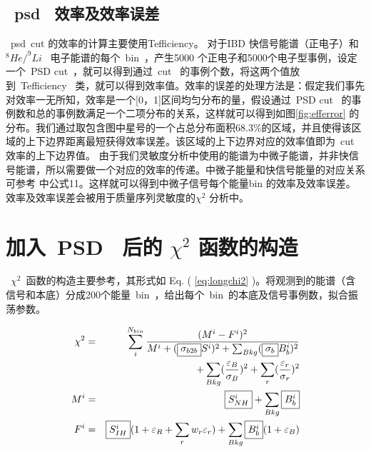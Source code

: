 \subsection{~psd~ 效率及效率误差}
~psd~cut 的效率的计算主要使用Tefficiency\citep{TEfficiency}。 对于IBD 快信号能谱（正电子）和~$^{8}He/^{9}Li$~ 电子能谱的每个~bin~，产生5000 个正电子和5000个电子型事例，设定一个~PSD cut~，就可以得到通过~cut~ 的事例个数，将这两个值放到~Tefficiency~ 类，就可以得到效率值。效率的误差的处理方法是：假定我们事先对效率一无所知，效率是一个[0，1]区间均匀分布的量，假设通过~PSD cut~ 的事例数和总的事例数满足一个二项分布的关系，这样就可以得到如图\ref{fig:efferror} 的分布。我们通过取包含图中星号的一个占总分布面积68.3\%的区域，并且使得该区域的上下边界距离最短获得效率误差。该区域的上下边界对应的效率值即为~cut~ 效率的上下边界值。
由于我们灵敏度分析中使用的能谱为中微子能谱，并非快信号能谱，所以需要做一个对应的效率的传递。中微子能量和快信号能量的对应关系可参考\citep{vogel1999angular} 中公式11。这样就可以得到中微子信号每个能量bin 的效率及效率误差。效率及效率误差会被用于质量序列灵敏度的$\chi^2$ 分析中。
\section{加入~PSD~ 后的 $\chi^2$ 函数的构造}
~$\chi^2$~函数的构造主要参考\citep{li2013unambiguous}，其形式如 Eq. ( \ref{eq:longchi2} )。将观测到的能谱（含信号和本底）分成200个能量~bin~，给出每个~bin~的本底及信号事例数，拟合振荡参数。

\begin{eqnarray}
\label{eq:longchi2}
 \chi^{2} &=&
    \sum_i^{N_{bin}}  \frac{(M^{i}-F^{i})^2}{M^{i}+( {\fbox{$ \sigma_{b2b} $}} S^i)^{2}+\sum_{Bkg}( {\fbox{$ \sigma_{b}$}} B^i_b)^2}  \nonumber \\
       && +\sum_{Bkg}(\frac{\varepsilon_B}{\sigma_B})^2
        +\sum_r(\frac{\varepsilon_r}{\sigma_r})^2 \nonumber \\
          M^i &=& {\fbox{$ S^i_{NH} $}}+\sum_{Bkg}{\fbox {$ B^i_b $} } \nonumber  \\
      F^i &=& {\fbox{$ S^i_{IH}$}}(1+\varepsilon_R+\sum_{r}w_r\varepsilon_{r})+\sum_{Bkg}{\fbox {$B^i_b$}}(1+\varepsilon_B)
\end{eqnarray}

